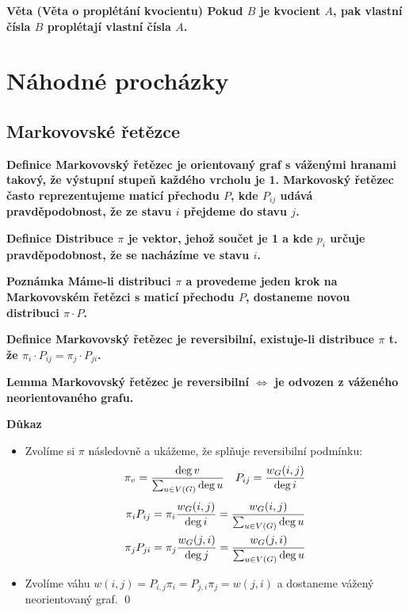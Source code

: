 \documentclass[a4paper,12pt,titlepage]{article}
\newcommand{\lm}{\smallskip\noindent\bf Lemma\rm{} }
\newcommand{\dk}{\smallskip\noindent\bf Důkaz\rm{} }
\newcommand{\df}{\smallskip\noindent\bf Definice\rm{} }
\newcommand{\vt}{\smallskip\noindent\bf Věta\rm{} }
\newcommand{\pzn}{\smallskip\noindent\bf Poznámka\rm{} }
\begin{document}
\vt (Věta o proplétání kvocientu) Pokud $B$ je kvocient $A$, pak vlastní čísla
$B$ proplétají vlastní čísla $A$.


\section{Náhodné procházky}
\subsection{Markovovské řetězce}

\df Markovovský řetězec je orientovaný graf s váženými hranami takový, že
výstupní stupeň každého vrcholu je 1. Markovoský řetězec často reprezentujeme
maticí přechodu $P$, kde $P_{ij}$ udává pravděpodobnost, že ze stavu $i$
přejdeme do stavu $j$.

\df Distribuce $\pi$ je vektor, jehož součet je 1 a kde $p_i$ určuje
pravděpodobnost, že se nacházíme ve stavu $i$.

\pzn Máme-li distribuci $\pi$ a provedeme jeden krok na Markovovském řetězci s
maticí přechodu $P$, dostaneme novou distribuci $\pi\cdot P$.

\df Markovovský řetězec je reversibilní, existuje-li distribuce $\pi$
t. že $\pi_i\cdot P_{ij} = \pi_j\cdot P_{ji}$.

\lm Markovovský řetězec je reversibilní $\Leftrightarrow$ je odvozen z váženého neorientovaného grafu.

\dk 
\begin{itemize}

\item[\uv{$\Leftarrow$}]
Zvolíme si $\pi$ následovně a ukážeme, že splňuje reversibilní podmínku:
\begin{align*}
& \pi_v = {\deg v\over \sum_{u\in V(G)} \deg u} & P_{ij} = {w_G(i,j)\over \deg i} \\ 
\end{align*}
\begin{align*}
\pi_i P_{ij} &= \pi_i {w_G(i,j)\over \deg i} = {w_G(i,j)\over \sum_{u\in V(G)}\deg u} \\
\pi_j P_{ji} &= \pi_j {w_G(j,i)\over \deg j} = {w_G(j,i)\over \sum_{u\in V(G)}\deg u}
\end{align*}

\item[\uv{$\Rightarrow$}]
Zvolíme váhu $w(i,j) = P_{i,j}\pi_i = P_{j,i}\pi_j = w(j,i)$ a dostaneme vážený
neorientovaný graf.
\qed
\end{itemize}
\end{document}
